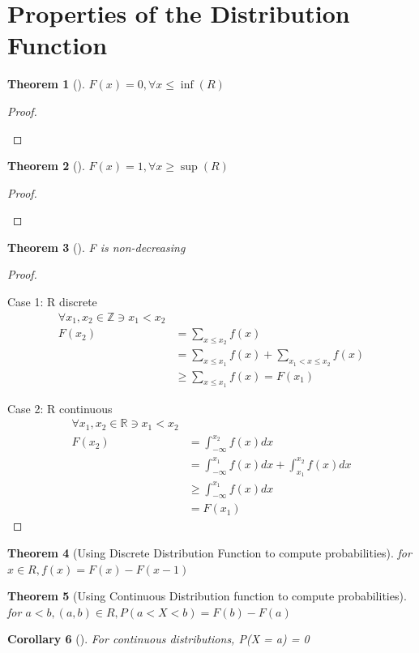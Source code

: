 \documentclass[10pt,]{book}
\theoremstyle{plain}
\newtheorem{theorem}{Theorem}[section]
\newtheorem{corollary}[theorem]{Corollary}
\theoremstyle{definition}
\theoremstyle{definition}
\theoremstyle{definition}
\numberwithin{equation}{section}
\newcommand{\lt}{ < }
\begin{document}
\section[Properties of the Distribution Function]{Properties of the Distribution Function}\label{section-24}
\begin{theorem}[]\label{theorem-Fmin}
\(F(x)=0, \forall x \le \inf(R)\)\end{theorem}
\begin{proof}\hypertarget{proof-23}{}
\end{proof}
\begin{theorem}[]\label{theorem-Fmax}
\(F(x)=1, \forall x \ge \sup(R)\)\end{theorem}
\begin{proof}\hypertarget{proof-24}{}
\end{proof}
\begin{theorem}[]\label{theorem-28}
F is non-decreasing\end{theorem}
\begin{proof}\hypertarget{proof-25}{}
Case 1: R discrete%
\begin{align*}
\forall x_1,x_2 \in \mathbb{Z} \ni x_1 \lt x_2\\
F(x_2) & = \sum_{x \le x_2} f(x) \\
& = \sum_{x \le x_1} f(x) + \sum_{x_1 \lt x \le x_2} f(x)\\
& \ge \sum_{x \le x_1} f(x) = F(x_1)
\end{align*}\par
Case 2: R continuous%
\begin{align*}
\forall x_1,x_2 \in \mathbb{R} \ni x_1 \lt x_2\\
F(x_2) & = \int_{-\infty}^{x_2} f(x) dx \\
 & = \int_{-\infty}^{x_1} f(x) dx + \int_{x_1}^{x_2} f(x) dx\\
 & \ge \int_{-\infty}^{x_1} f(x) dx\\
 & = F(x_1)
\end{align*}\end{proof}
\begin{theorem}[Using Discrete Distribution Function to compute probabilities]\label{theorem-Fvsf-discrete}
for \(x \in R, f(x) = F(x) - F(x-1)\)\end{theorem}
\begin{theorem}[Using Continuous Distribution function to compute probabilities]\label{theorem-Fvsf-continuyous}
for \(a \lt b, (a,b) \in R, P(a \lt X \lt b) = F(b) - F(a)\)\end{theorem}
\begin{corollary}[]\label{corollary-ProbPointZero-continuous}
For continuous distributions, P(X = a) = 0\end{corollary}
\typeout{************************************************}
\typeout{************************************************}
\end{document}
